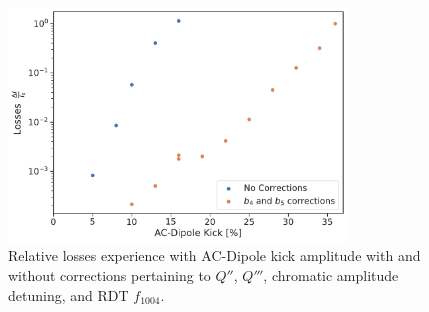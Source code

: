 \begin{figure}[!htb]
    \centering
    \includegraphics[width=0.8\textwidth]{./images/losses_with_without_b4b5corr.pdf}
    \caption{Relative losses experience with AC-Dipole kick amplitude with and without corrections
    pertaining to $Q''$, $Q'''$, chromatic amplitude detuning, and RDT $f_{1004}$.}
    \label{fig:decapoles:losses_b4b5_corrs}
\end{figure}

\FloatBarrier